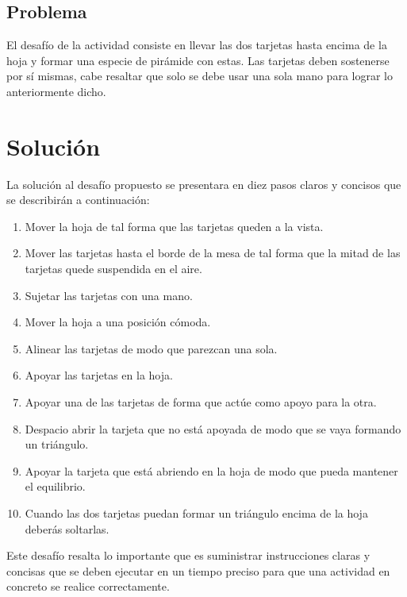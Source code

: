 \documentclass{article}
\begin{document}
    \subsection{Problema}
    El desafío de la actividad consiste en llevar las dos tarjetas hasta encima de la hoja y formar una especie de pirámide con estas. Las tarjetas deben sostenerse por sí mismas, cabe resaltar que solo se debe usar una sola mano para lograr lo anteriormente dicho.

\section{Solución}
La solución al desafío propuesto se presentara en diez pasos claros y concisos que se describirán a continuación:
    \begin{enumerate}
        \item {Mover la hoja de tal forma que las tarjetas queden a la vista.}
        \item {Mover las tarjetas hasta el borde de la mesa de tal forma que la mitad de las tarjetas quede suspendida en el aire.}
        \item {Sujetar las tarjetas con una mano.}
        \item {Mover la hoja a una posición cómoda.}
        \item {Alinear las tarjetas de modo que parezcan una sola.}
        \item {Apoyar las tarjetas en la hoja.}
        \item {Apoyar una de las tarjetas de forma que actúe como apoyo para la otra.}
        \item {Despacio abrir la tarjeta que no está apoyada de modo que se vaya formando un triángulo.}
        \item {Apoyar la tarjeta que está abriendo en la hoja de modo que pueda mantener el equilibrio.}
        \item {Cuando las dos tarjetas puedan formar un triángulo encima de la hoja deberás soltarlas.}
    \end{enumerate}
Este desafío resalta lo importante que es suministrar instrucciones claras y concisas que se deben ejecutar en un tiempo preciso para que una actividad en concreto se realice correctamente.
\end{document}
